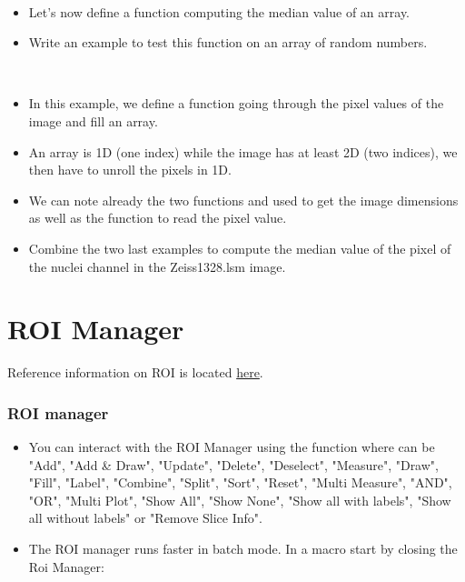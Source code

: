 \begin{frame}
  \begin{example}~\par
    \begin{itemize}
    \item Let's now define a function computing the median value of an array.\par
      
    \item Write an example to test this function on an array of random numbers.
    \end{itemize}

  \end{example}
\end{frame}

\begin{frame}
  \begin{example}~\par
    \begin{itemize}
    \item In this example, we define a function going through the pixel
      values of the image and fill an array.
    \item An array is 1D (one index) while the image has at least 2D
      (two indices), we then have to unroll the pixels in 1D.
      
    \item We can note already the two functions  and
       used to get the image dimensions as well as the
      function  to read the pixel value.
    \item Combine the two last examples to compute the median value of
      the pixel of the nuclei channel in the Zeiss1328.lsm image.
    \end{itemize}
  \end{example}
\end{frame}

\section{ROI Manager}
Reference information on ROI is located
\href{http://rsb.info.nih.gov/ij/developer/macro/functions.html#Roi}{here}.
\begin{frame}[fragile]
	\frametitle<presentation>{ROI manager}
	\begin{itemize}
		\item You can interact with the ROI Manager using the function
		 where  can be "Add", "Add \&
		Draw", "Update", "Delete", "Deselect", "Measure", "Draw", "Fill",
		"Label", "Combine", "Split", "Sort", "Reset", "Multi Measure",
		"AND", "OR", "Multi Plot", "Show All", "Show None", "Show all with
		labels", "Show all without labels" or "Remove Slice Info".
		\item The ROI manager runs faster in batch mode. In a macro start
		by closing the Roi Manager:
		
	\end{itemize}
\end{frame}

